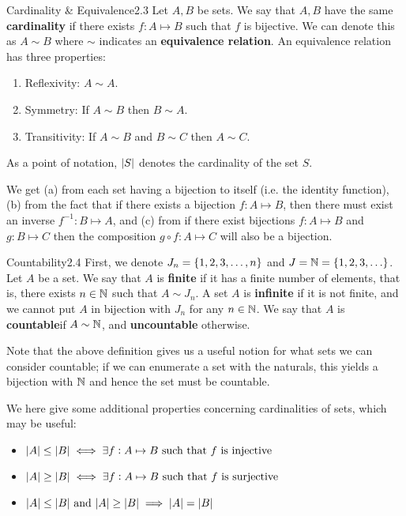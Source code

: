 \begin{definition}{Cardinality \& Equivalence}{2.3}
    Let $A, B$ be sets. We say that $A, B$ have the same \textbf{cardinality} if there exists $f: A \mapsto B$ such that $f$ is bijective. We can denote this as $A \sim B$ where $\sim$ indicates an \textbf{equivalence relation}. An equivalence relation has three properties:
    \begin{enumerate}
        \item Reflexivity: $A \sim A$.
        \item Symmetry: If $A \sim B$ then $B \sim A$.
        \item Transitivity: If $A \sim B$ and $B \sim C$ then $A \sim C$.
    \end{enumerate}
    As a point of notation, $\abs{S}$ denotes the cardinality of the set $S$. 
\end{definition}

\noindent We get (a) from each set having a bijection to itself (i.e. the identity function), (b) from the fact that if there exists a bijection $f: A \mapsto B$, then there must exist an inverse $f^{-1}: B \mapsto A$, and (c) from if there exist bijections $f: A \mapsto B$ and $g: B \mapsto C$ then the composition $g \circ f: A \mapsto C$ will also be a bijection. 

\begin{definition}{Countability}{2.4}
    First, we denote $J_n = \set{1, 2, 3, \ldots, n}$ and $J = \mathbb{N} = \set{1, 2, 3, \ldots}$. Let $A$ be a set. We say that $A$ is \textbf{finite} if it has a finite number of elements, that is, there exists $n \in \mathbb{N}$ such that $A \sim J_n$. A set $A$ is \textbf{infinite} if it is not finite, and we cannot put $A$ in bijection with $J_n$ for any $n \in \mathbb{N}$. We say that $A$ is \textbf{countable}if $A \sim \mathbb{N}$, and \textbf{uncountable} otherwise. 
\end{definition}

\noindent Note that the above definition gives us a useful notion for what sets we can consider countable; if we can enumerate a set with the naturals, this yields a bijection with $\mathbb{N}$ and hence the set must be countable. 

We here give some additional properties concerning cardinalities of sets, which may be useful:
\begin{itemize}
    \item $\abs{A} \leq \abs{B} \iff \exists f: A \mapsto B \text{ such that $f$ is injective}$
    \item $\abs{A} \geq \abs{B} \iff \exists f: A \mapsto B \text{ such that $f$ is surjective}$
    \item $\abs{A} \leq \abs{B} \text{ and } \abs{A} \geq \abs{B} \implies \abs{A} = \abs{B}$
\end{itemize}

